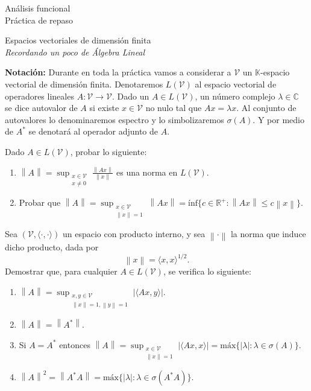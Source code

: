 \documentclass{article}
\newcommand{\R}{\mathbb{R}}
\newcommand{\C}{\mathbb{C}}
\newcommand{\K}{\mathbb{K}}
\newcommand{\norm}[1]{\left\lVert #1 \right\rVert}       %
\newenvironment{ejercicio}[1]{\begin{trivlist}
\item[\hskip \labelsep {\bfseries Ejercicio}\hskip \labelsep {\bfseries #1.}]}{\end{trivlist}}
\begin{document}
\begin{center}
    {\Huge Análisis funcional}\\[0.15cm]
    Práctica de repaso

    \vspace{0.4cm}

    {\Large Espacios vectoriales de dimensión finita}\\[0.1cm]
    \textit{Recordando un poco de Álgebra Lineal}
\end{center}

\noindent \textbf{Notación:} Durante en toda la práctica vamos a considerar a \(\mathcal{V}\) un \(\K\)-espacio vectorial de dimensión finita. Denotaremos \(L(\mathcal{V})\) al espacio vectorial de operadores lineales \(A:\mathcal{V}\to\mathcal{V}\). Dado un \(A\in L(\mathcal{V})\), un número complejo \(\lambda\in\C\) se dice autovalor de \(A\) si existe \(x\in\mathcal{V}\) no nulo tal que \(Ax=\lambda x\). Al conjunto de autovalores lo denominaremos espectro y lo simbolizaremos \(\sigma(A)\). Y por medio de \(A^*\) se denotará al operador adjunto de \(A\).

\begin{ejercicio}{1}
    Dado \(A\in L(\mathcal{V})\), probar lo siguiente:
    \begin{enumerate}
        \item \(\displaystyle \norm{A} = \sup_{\substack{x\in\mathcal{V}\\x\neq0}} \frac{\norm{Ax}}{\norm{x}}\) es una norma en \(L(\mathcal{V})\).
        \item Probar que \(\displaystyle \norm{A} = \sup_{\substack{x\in\mathcal{V}\\\norm{x}=1}} \norm{Ax} = \text{\'inf}\{c\in\R^+ : \norm{Ax}\leq c\norm{x}\}\).
    \end{enumerate}
\end{ejercicio}

\vspace{0.5cm}

\begin{ejercicio}{2}
    Sea \((\mathcal{V}, \langle\cdot,\cdot\rangle)\) un espacio con producto interno, y sea \(\norm{\cdot}\) la norma que induce dicho producto, dada por
    \[
        \norm{x} = \langle x,x\rangle^{1/2}.
    \]
    Demostrar que, para cualquier \(A\in L(\mathcal{V})\), se verifica lo siguiente:
    \begin{enumerate}
        \item \(\displaystyle \norm{A} = \sup_{\substack{x,y\in\mathcal{V}\\\norm{x}=1,\norm{y}=1}} |\langle Ax,y\rangle|\).
        \item \(\norm{A} = \norm{A^*}\).
        \item Si \(A=A^*\) entonces \(\displaystyle \norm{A} = \sup_{\substack{x\in\mathcal{V}\\\norm{x}=1}} |\langle Ax,x\rangle| = \text{m\'ax}\{|\lambda| : \lambda\in\sigma(A)\}\).
        \item \(\norm{A}^2 = \norm{A^*A} = \text{m\'ax}\{|\lambda| : \lambda\in\sigma(A^*A)\}\).
    \end{enumerate}
\end{ejercicio}
\end{document}
